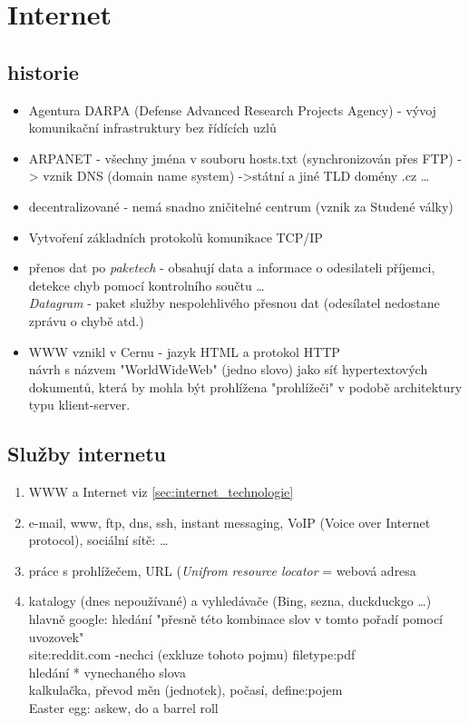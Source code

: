 \documentclass[12pt]{article}
\begin{document}
\section{Internet}
\subsection{historie}
\begin{itemize}
\item Agentura DARPA (Defense Advanced Research Projects Agency) - vývoj komunikační infrastruktury bez řídících uzlů
\item ARPANET - všechny jména v souboru hosts.txt (synchronizován přes FTP) -> vznik DNS (domain name system) ->státní a jiné TLD domény .cz \dots 
\item decentralizované - nemá snadno zničitelné centrum (vznik za Studené války)
\item Vytvoření základních protokolů komunikace TCP/IP
\item přenos dat po \emph{paketech} - obsahují data a informace o odesilateli příjemci, detekce chyb pomocí kontrolního součtu \dots \\
\emph{Datagram} - paket služby nespolehlivého přesnou dat (odesílatel nedostane zprávu o chybě atd.)
\item WWW vznikl v Cernu - jazyk HTML a protokol HTTP\\
návrh s názvem "WorldWideWeb" (jedno slovo) jako síť hypertextových dokumentů, která by mohla být prohlížena "prohlížeči" v podobě architektury typu klient-server.
\end{itemize}
\subsection{Služby internetu}
\begin{enumerate}
\item WWW a Internet viz \ref{sec:internet_technologie}
\item e-mail, www, ftp, dns, ssh, instant messaging, VoIP (Voice over Internet protocol), sociální sítě: \dots
\item práce s prohlížečem, URL (\emph{Unifrom resource locator} = webová adresa
\item katalogy (dnes nepoužívané) a vyhledávače  (Bing, sezna, duckduckgo \dots) hlavně google:
hledání "přesně této kombinace slov v tomto pořadí pomocí uvozovek"\\
site:reddit.com \qquad -nechci (exkluze tohoto pojmu) \qquad filetype:pdf\\
hledání * vynechaného slova\\
kalkulačka, převod měn (jednotek), počasí, define:pojem\\
Easter egg: askew, do a barrel roll
\end{enumerate}
\end{document}
